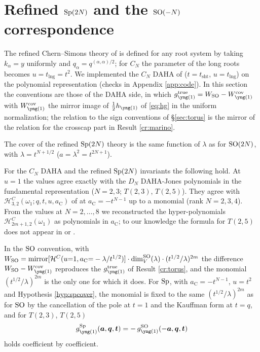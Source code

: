 \section{Refined \texorpdfstring{$\mathrm{Sp}(2N)$}{Sp(2N)} and the \texorpdfstring{$\mathrm{SO}(-N)$}{SO(-N)} correspondence}\label{sec:sp}
The refined Chern--Simons theory of \cite{AM22} is defined for any root system by taking $k_\alpha = y$ uniformly and $q_\alpha = q^{(\alpha,\alpha)/2}$; for $C_N$ the parameter of the long roots becomes $u = t_{\mathrm{lng}} = t^2$. We implemented the $C_N$ DAHA of \cite{Cherednik11} ($t = t_{\mathrm{sht}}$, $u = t_{\mathrm{lng}}$) on the polynomial representation (checks in Appendix \ref{app:code}). In this section the conventions are those of the DAHA side, in which $g^{\mathrm{true}}_{\yone} = W_{\SO} - W^{\cov}_{\yone}$ with $W^{\cov}_{\yone}$ the mirror image of $\tfrac12 h_{\yone}$ of \eqref{eq:hg} in the uniform normalization; the relation to the sign conventions of \S\ref{sec:torus} is the mirror of the relation for the crosscap part in Result \ref{cr:marino}.
\begin{hypothesis}\label{hyp:spcover}
The cover of the refined $\mathrm{Sp}(2N)$ theory is the same function of $\lambda$ as for $\mathrm{SO}(2N)$, with $\lambda = t^{N+1/2}$ ($a = \lambda^2 = t^{2N+1}$).
\end{hypothesis}
\begin{result}\label{cr:cn}
For the $C_N$ DAHA and the refined $\mathrm{Sp}(2N)$ invariants the following hold. At $u = 1$ the values agree exactly with the $D_N$ DAHA-Jones polynomials in the fundamental representation ($N = 2, 3$; $T(2,3)$, $T(2,5)$). They agree with $\mathcal{H}^C_{3,2}(\omega_1; q, t, u, a_{\mathrm{C}})$ of \cite{Cherednik11} at $a_{\mathrm{C}} = -t^{N-1}$ up to a monomial (rank $N = 2, 3, 4$). From the values at $N = 2, \dots, 8$ we reconstructed the hyper-polynomials $\mathcal{H}^C_{2m+1,2}(\omega_1)$ as polynomials in $a_{\mathrm{C}}$; to our knowledge the formula for $T(2,5)$ does not appear in \cite{Cherednik11} or \cite{CE15}.

In the $\mathrm{SO}$ convention, with $W_{\mathrm{SO}} = \operatorname{mirror}[\mathcal{H}^C(u{=}1, a_{\mathrm{C}}{=}-\lambda/t^{1/2})]\cdot\dim_V^{\mathrm{SO}}(\lambda)\cdot(t^{1/2}/\lambda)^{2m}$ the difference $W_{\SO} - W^{\cov}_{\yone}$ reproduces the $g^{\mathrm{true}}_{\yone}$ of Result \ref{cr:torus}, and the monomial $(t^{1/2}/\lambda)^{2m}$ is the only one for which it does.
For $\mathrm{Sp}$, with $a_{\mathrm{C}} = -t^{N-1}$, $u = t^2$ and Hypothesis \ref{hyp:spcover}, the monomial is fixed to the same $(t^{1/2}/\lambda)^{2m}$ as for $\mathrm{SO}$ by the cancellation of the pole at $t = 1$ and the Kauffman form at $t = q$, and for $T(2,3)$, $T(2,5)$
\begin{equation}\label{eq:sp1}
g^{\Sp}_{\yone}(\ba, \bq, \bt) = -\,g^{\SO}_{\yone}(-\ba, \bq, \bt)
\end{equation}
holds coefficient by coefficient.
\end{result}

